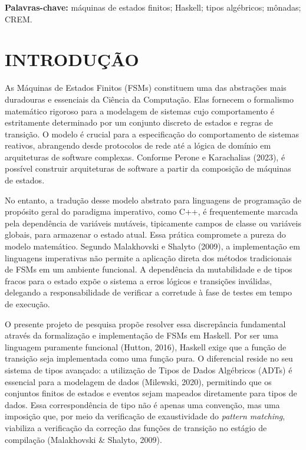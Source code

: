 \documentclass[12pt,a4paper]{article}
\begin{document}
\vspace{0.5cm}
\noindent\textbf{Palavras-chave:} máquinas de estados finitos; Haskell; tipos algébricos; mônadas; CREM.


\newpage
\tableofcontents

\newpage
\section{INTRODUÇÃO}

As Máquinas de Estados Finitos (FSMs) constituem uma das abstrações mais duradouras e essenciais da Ciência da Computação. Elas fornecem o formalismo matemático rigoroso para a modelagem de sistemas cujo comportamento é estritamente determinado por um conjunto discreto de estados e regras de transição. O modelo é crucial para a especificação do comportamento de sistemas reativos, abrangendo desde protocolos de rede até a lógica de domínio em arquiteturas de software complexas. Conforme Perone e Karachalias (2023), é possível construir arquiteturas de software a partir da composição de máquinas de estados.

No entanto, a tradução desse modelo abstrato para linguagens de programação de propósito geral do paradigma imperativo, como C++, é frequentemente marcada pela dependência de variáveis mutáveis, tipicamente campos de classe ou variáveis globais, para armazenar o estado atual. Essa prática compromete a pureza do modelo matemático. Segundo Malakhovski e Shalyto (2009), a implementação em linguagens imperativas não permite a aplicação direta dos métodos tradicionais de FSMs em um ambiente funcional. A dependência da mutabilidade e de tipos fracos para o estado expõe o sistema a erros lógicos e transições inválidas, delegando a responsabilidade de verificar a corretude à fase de testes em tempo de execução.

O presente projeto de pesquisa propõe resolver essa discrepância fundamental através da formalização e implementação de FSMs em Haskell. Por ser uma linguagem puramente funcional (Hutton, 2016), Haskell exige que a função de transição seja implementada como uma função pura. O diferencial reside no seu sistema de tipos avançado: a utilização de Tipos de Dados Algébricos (ADTs) é essencial para a modelagem de dados (Milewski, 2020), permitindo que os conjuntos finitos de estados e eventos sejam mapeados diretamente para tipos de dados. Essa correspondência de tipo não é apenas uma convenção, mas uma imposição que, por meio da verificação de exaustividade do \textit{pattern matching}, viabiliza a verificação da correção das funções de transição no estágio de compilação (Malakhovski \& Shalyto, 2009).
\end{document}
